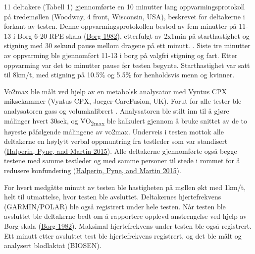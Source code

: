 \documentclass[
]{book}
\begin{document}
11 deltakere (Tabell 1) gjennomførte en 10 minutter lang
oppvarmingsprotokoll på tredemøllen (Woodway, 4 front, Wisconsin, USA),
beskrevet for deltakerne i forkant av testen. Denne
oppvarmingsprotokollen bestod av fem minutter på 11-13 i Borg 6-20 RPE
skala (\protect\hyperlink{ref-borg1982}{Borg 1982}), etterfulgt av
2x1min på starthastighet og stigning med 30 sekund pause mellom dragene
på ett minutt. . Siste tre minutter av oppvarming ble gjennomført 11-13
i borg på valgfri stigning og fart. Etter oppvarming var det to minutter
pause før testen begynte. Starthastighet var satt til 8km/t, med
stigning på 10.5\% og 5.5\% for henholdsvis menn og kvinner.

Vo2max ble målt ved hjelp av en metabolsk analysator med Vyntus CPX
miksekammer (Vyntus CPX, Jaeger-CareFusion, UK). Forut for alle tester
ble analysatoren gass og volumkalibrert . Analysatoren ble stilt inn til
å gjøre målinger hvert 30sek, og V̇O\textsubscript{2max} ble kalkulert
gjennom å bruke snittet av de to høyeste påfølgende målingene av vo2max.
Underveis i testen mottok alle deltakerne en høylytt verbal oppmuntring
fra testleder som var standisert
(\protect\hyperlink{ref-halperin2015}{Halperin, Pyne, and Martin 2015}).
Alle deltakerne gjennomførte også begge testene med samme testleder og
med samme personer til stede i rommet for å redusere konfundering
(\protect\hyperlink{ref-halperin2015}{Halperin, Pyne, and Martin 2015}).

For hvert medgåtte minutt av testen ble hastigheten på møllen økt med
1km/t, helt til utmattelse, hvor testen ble avsluttet. Deltakernes
hjertefrekvens (GARMIN/POLAR) ble også registrert under hele testen. Når
testen ble avsluttet ble deltakerne bedt om å rapportere opplevd
anstrengelse ved hjelp av Borg-skala
(\protect\hyperlink{ref-borg1982}{Borg 1982}). Maksimal hjertefrekvens
under testen ble også registrert. Ett minutt etter avsluttet test ble
hjertefrekvens registrert, og det ble målt og analysert blodlaktat
(BIOSEN).

\hypertarget{section}{%
\section{}\label{section}}

\providecommand{\docline}[3]{\noalign{\global\setlength{\arrayrulewidth}{#1}}\arrayrulecolor[HTML]{#2}\cline{#3}}

\setlength{\tabcolsep}{2pt}

\renewcommand*{\arraystretch}{1.5}
\end{document}
